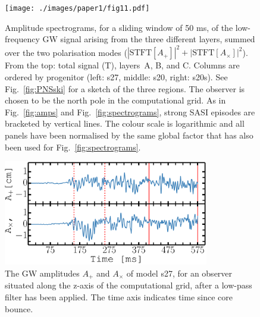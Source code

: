 \begin{figure}
\centering
\texttt{[image: ./images/paper1/fig11.pdf]}
\caption{Amplitude spectrograms, for a sliding window of 50 ms, of the low-frequency GW signal arising from the three different layers,
  summed over the two polarisation modes ($|\text{STFT}[{A_+}]|^2 + |\text{STFT}[{A_{\times}}]|^2$). 
  From the top: total signal (T), layers~A, B, and C. Columns
  are ordered by progenitor (left: s27, middle: s20, right: s20s). 
  See Fig.~\ref{fig:PNSski} for a sketch of the three
  regions. The observer is chosen to be the north pole in the computational grid.
  As in Fig.~\ref{fig:amps} and Fig.~\ref{fig:spectrograms}, strong SASI episodes are bracketed by vertical lines. 
  The colour scale is logarithmic and all panels have been normalised by the same global factor that has also been used for Fig.~\ref{fig:spectrograms}.
\label{fig:lowspec}
}
\end{figure}

\begin{figure}
\centering
\includegraphics[width=0.8\textwidth]{./images/paper1/fig12.pdf}
\caption{The GW amplitudes $A_+$ and $A_{\times}$ of model s27, for an observer situated along the z-axis of the computational grid,
after a low-pass filter has been applied. The time axis indicates time since core bounce.
\label{fig:lowpass}}
\end{figure}


